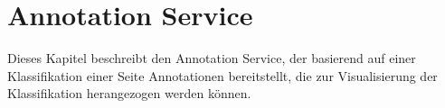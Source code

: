 \section{Annotation Service}
    \label{section:solutionDetailsAnnotationService}
    Dieses Kapitel beschreibt den Annotation Service,
    der basierend auf einer Klassifikation einer Seite Annotationen bereitstellt,
    die zur Visualisierung der Klassifikation herangezogen werden können.

    
    
    
